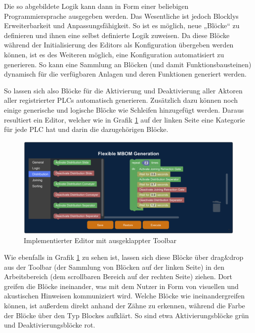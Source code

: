 Die so abgebildete Logik kann dann in Form einer beliebigen Programmiersprache ausgegeben werden. Das Wesentliche ist jedoch Blocklys Erweiterbarkeit und Anpassungsfähigkeit. So ist es möglich, neue „Blöcke“ zu definieren und ihnen eine selbst definierte Logik zuweisen. Da diese Blöcke während der Initialisierung des Editors als Konfiguration übergeben werden können, ist es des Weiteren möglich, eine Konfiguration automatisiert zu generieren. So kann eine Sammlung an Blöcken (und damit Funktionsbausteinen) dynamisch für die verfügbaren Anlagen und deren Funktionen generiert werden.

So lassen sich also Blöcke für die Aktivierung und Deaktivierung aller Aktoren aller registrierter PLCs automatisch generieren. Zusätzlich dazu können noch einige generische und logische Blöcke wie Schleifen hinzugefügt werden. Daraus resultiert ein Editor, welcher wie in Grafik \ref{fig:MBOMGen_Config} auf der linken Seite eine Kategorie für jede PLC hat und darin die dazugehörigen Blöcke.
%
\begin{figure}[htbp]
	\centering\includegraphics[width=1.0\textwidth]{images/04/MBOMGen_Config.pdf}
    \caption{Implementierter Editor mit ausgeklappter Toolbar}
    \label{fig:MBOMGen_Config}
\end{figure}

Wie ebenfalls in Grafik \ref{fig:MBOMGen_Config} zu sehen ist, lassen sich diese Blöcke über drag\&drop aus der Toolbar (der Sammlung von Blöcken auf der linken Seite) in den Arbeitsbereich (dem scrollbaren Bereich auf der rechten Seite) ziehen. Dort greifen die Blöcke ineinander, was mit dem Nutzer in Form von visuellen und akustischen Hinweisen kommuniziert wird. Welche Blöcke wie ineinandergreifen können, ist außerdem direkt anhand der Zähne zu erkennen, während die Farbe der Blöcke über den Typ Blockes aufklärt. So sind etwa Aktivierungsblöcke grün und Deaktivierungsblöcke rot.

